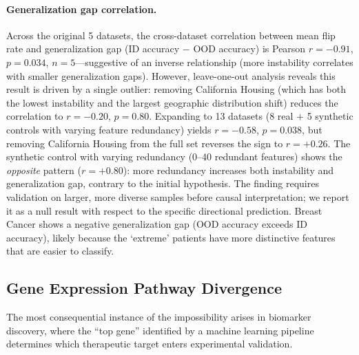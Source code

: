 \documentclass[11pt,a4paper]{article}
\begin{document}
\paragraph{Generalization gap correlation.}
Across the original 5 datasets, the cross-dataset correlation between mean flip rate and generalization gap (ID accuracy $-$ OOD accuracy) is Pearson $r = -0.91$, $p = 0.034$, $n = 5$---suggestive of an inverse relationship (more instability correlates with smaller generalization gaps).  However, leave-one-out analysis reveals this result is driven by a single outlier: removing California Housing (which has both the lowest instability and the largest geographic distribution shift) reduces the correlation to $r = -0.20$, $p = 0.80$.  Expanding to 13 datasets (8 real $+$ 5 synthetic controls with varying feature redundancy) yields $r = -0.58$, $p = 0.038$, but removing California Housing from the full set reverses the sign to $r = +0.26$.  The synthetic control with varying redundancy (0--40 redundant features) shows the \emph{opposite} pattern ($r = +0.80$): more redundancy increases both instability and generalization gap, contrary to the initial hypothesis.  The finding requires validation on larger, more diverse samples before causal interpretation; we report it as a null result with respect to the specific directional prediction.  Breast Cancer shows a negative generalization gap (OOD accuracy exceeds ID accuracy), likely because the `extreme' patients have more distinctive features that are easier to classify.

\subsection{Gene Expression Pathway Divergence}
\label{sec:gene-expression}

The most consequential instance of the impossibility arises in biomarker discovery, where the ``top gene'' identified by a machine learning pipeline determines which therapeutic target enters experimental validation.
\end{document}
